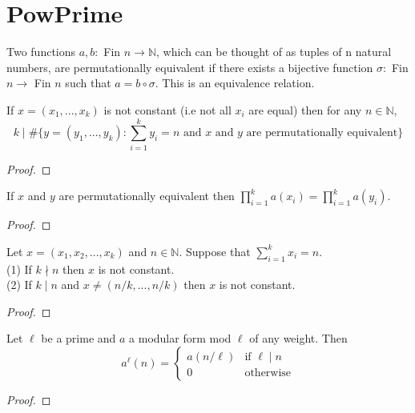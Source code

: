 \section{PowPrime}


\begin{definition} 
  \label{def:perm_equiv}
  \leanok
  Two functions $a, b : $ Fin $n \to \mathbb{N}$, which can be thought of as tuples of n natural numbers,
  are permutationally equivalent if there exists a bijective function $\sigma : $ Fin $n \to $ Fin $n$ such that 
  $a = b \circ \sigma$. This is an equivalence relation. 
\end{definition}

\begin{lemma}
  \label{lem:non_diag_vanish}
  \leanok
  If $x = (x_1, ..., x_k)$ is not constant (i.e not all $x_i$ are equal) then for any $n \in \mathbb{N}$,
  \[ k \mid \# \{y = (y_1, ..., y_k) : \sum_{i = 1}^k y_i = n \text{   and $x$ and $y$ are permutationally equivalent} \} \]
\end{lemma}
\begin{proof}
  \leanok
\end{proof}

\begin{lemma}
  \label{lem:prod_eq_of_perm_equiv}
  \leanok
  If $x$ and $y$ are permutationally equivalent then $\prod_{i = 1}^k a(x_i) = \prod_{i = 1}^k a(y_i)$.
\end{lemma}
\begin{proof}
  \leanok
\end{proof}

\begin{lemma}
  \label{lem:non_const_of_tuple}
  \leanok
  Let $x = (x_1, x_2, ..., x_k)$ and $n \in \mathbb{N}$. Suppose that $\sum_{i = 1}^k x_i = n$. \\
  (1) If $k \nmid n$ then $x$ is not constant. \\
  (2) If $k \mid n$ and $x \neq (n/k, ..., n/k)$ then $x$ is not constant.
\end{lemma}
\begin{proof}
  \leanok
\end{proof}

\begin{theorem} 
  \label{thm:Pow_Prime}
  \leanok
  Let $\ell$ be a prime and $a$ a modular form mod $\ell$ of any weight. Then \\
  \[a ^ \ell (n) = \begin{cases} a (n / \ell) & \text{if $\ell \mid n$} \\
    0 & \text{otherwise} \end{cases} \]
\end{theorem}
\begin{proof}
  \leanok
\end{proof}



